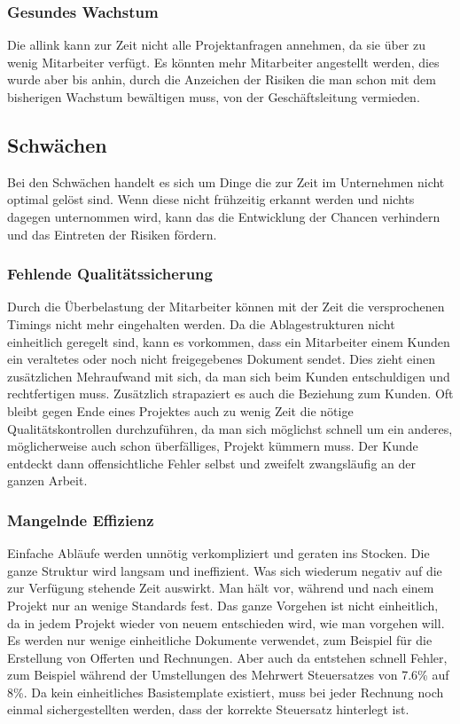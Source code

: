 \subsubsection{Gesundes Wachstum}
Die allink kann zur Zeit nicht alle Projektanfragen annehmen, da sie über zu
wenig Mitarbeiter verfügt. Es könnten mehr Mitarbeiter angestellt werden, dies
wurde aber bis anhin, durch die Anzeichen der Risiken die man schon mit dem bisherigen
Wachstum bewältigen muss, von der Geschäftsleitung vermieden.

\subsection{Schwächen}
Bei den Schwächen handelt es sich um Dinge die zur Zeit im Unternehmen nicht
optimal gelöst sind. Wenn diese nicht frühzeitig erkannt werden und nichts
dagegen unternommen wird, kann das die Entwicklung der Chancen verhindern und
das Eintreten der Risiken fördern.

\subsubsection{Fehlende Qualitätssicherung}
Durch die Überbelastung der Mitarbeiter können mit der Zeit die versprochenen Timings
nicht mehr eingehalten werden. Da die Ablagestrukturen nicht einheitlich geregelt
sind, kann es vorkommen, dass ein Mitarbeiter einem Kunden ein veraltetes oder
noch nicht freigegebenes Dokument sendet. Dies zieht einen zusätzlichen 
Mehraufwand mit sich, da man sich beim Kunden entschuldigen und rechtfertigen
muss. Zusätzlich strapaziert es auch die Beziehung zum Kunden.
Oft bleibt gegen Ende eines Projektes auch zu wenig Zeit die nötige 
Qualitätskontrollen durchzuführen, da man sich möglichst schnell um ein anderes,
möglicherweise auch schon überfälliges, Projekt kümmern muss. Der Kunde entdeckt
dann offensichtliche Fehler selbst und zweifelt zwangsläufig an der ganzen Arbeit.

\subsubsection{Mangelnde Effizienz}
Einfache Abläufe werden unnötig verkompliziert und geraten ins Stocken. Die ganze
Struktur wird langsam und ineffizient. Was sich wiederum negativ auf die zur
Verfügung stehende Zeit auswirkt.
Man hält vor, während und nach einem Projekt nur an wenige Standards fest. 
Das ganze Vorgehen ist nicht einheitlich, da in jedem Projekt wieder von
neuem entschieden wird, wie man vorgehen will. Es werden nur wenige einheitliche
Dokumente verwendet, zum Beispiel für die Erstellung von Offerten und Rechnungen.
Aber auch da entstehen schnell Fehler, zum Beispiel während der Umstellungen des 
Mehrwert Steuersatzes von 7.6\% auf 8\%. Da kein einheitliches Basistemplate
existiert, muss bei jeder Rechnung noch einmal sichergestellten werden, dass
der korrekte Steuersatz hinterlegt ist.

